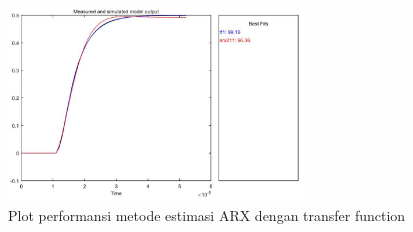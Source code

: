 \documentclass[../main.tex]{subfiles}
\begin{document}
                \begin{figure}[H]
                    \centering
                    \includegraphics[width = 0.7\textwidth]{assets/image/ESTIMATION MODEL.pdf}
                    \caption{Plot performansi metode estimasi ARX dengan transfer function}
                    \label{fig:my_label}
            \end{figure}
\end{document}
